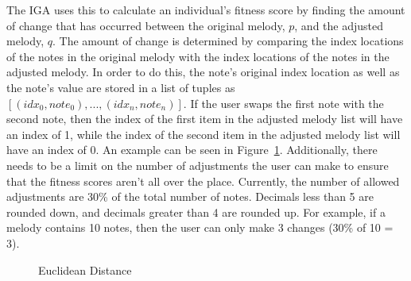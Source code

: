 \documentclass[12pt]{article} %
\begin{document}
The IGA uses this to calculate an individual's fitness score by finding the amount of change that has occurred between the original melody, $p$, and the adjusted melody, $q$. The amount of change is determined by comparing the index locations of the notes in the original melody with the index locations of the notes in the adjusted melody. In order to do this, the note's original index location as well as the note's value are stored in a list of tuples as $[(idx_{0},note_{0}), ... , (idx_{n}, note_{n})]$. If the user swaps the first note with the second note, then the index of the first item in the adjusted melody list will have an index of 1, while the index of the second item in the adjusted melody list will have an index of 0. An example can be seen in Figure~\ref{fig:ed_ex}. Additionally, there needs to be a limit on the number of adjustments the user can make to ensure that the fitness scores aren't all over the place. Currently, the number of allowed adjustments are 30\% of the total number of notes. Decimals less than 5 are rounded down, and decimals greater than 4 are rounded up.  For example, if a melody contains 10 notes, then the user can only make 3 changes (30\% of 10 = 3). \\




\begin{figure}[H]
\caption{Euclidean Distance}
\label{fig:ed_ex}
\end{figure}
\end{document}
